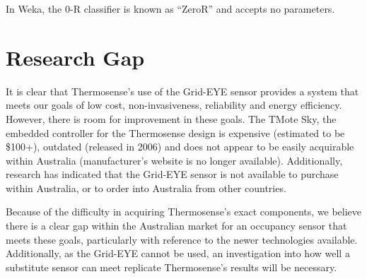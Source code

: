 \documentclass[../thesis/thesis.tex]{subfiles}
\begin{document}
In Weka, the 0-R classifier is known as ``ZeroR'' and accepts no parameters.

\section{Research Gap}
It is clear that Thermosense's use of the Grid-EYE sensor provides a system that meets our goals of low cost, non-invasiveness, reliability and energy efficiency. However, there is room for improvement in these goals. The TMote Sky, the embedded controller for the Thermosense design is expensive (estimated to be \$100+), outdated (released in 2006) and does not appear to be easily acquirable within Australia (manufacturer's website is no longer available). Additionally, research has indicated that the Grid-EYE sensor is not available to purchase within Australia, or to order into Australia from other countries.

Because of the difficulty in acquiring Thermosense's exact components, we believe there is a clear gap within the Australian market for an occupancy sensor that meets these goals, particularly with reference to the newer technologies available. Additionally, as the Grid-EYE cannot be used, an investigation into how well a substitute sensor can meet replicate Thermosense's results will be necessary.


\end{document}
